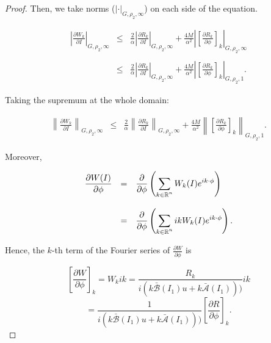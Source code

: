 \begin{proof}
Then, we take norms ($|\cdot|_{G,\rho_2,\infty}$) on each side of the equation.

$$
\begin{array}{rcl}
\displaystyle \left|\frac{\partial W_k}{\partial I}\right|_{G,\rho_2, \infty} & \leq & \displaystyle \frac{2}{\alpha}\left|\frac{\partial R_k}{\partial I}\right|_{G,\rho_2, \infty} +
\displaystyle \frac{4M}{\alpha^2}\left|\left[\frac{\partial R_k}{\partial \phi}\right]_k\right|_{G,\rho_2, \infty}\\
\\
& \leq & \displaystyle \frac{2}{\alpha}\left|\frac{\partial R_k}{\partial I}\right|_{G,\rho_2, \infty} +
\displaystyle \frac{4M}{\alpha^2}\left|\left[\frac{\partial R_k}{\partial \phi}\right]_k\right|_{G,\rho_2, 1}.
\end{array}
$$

Taking the supremum at the whole domain:

$$
\begin{array}{rcl}
\displaystyle \left\|\frac{\partial W_k}{\partial I}\right\|_{G,\rho_2, \infty} & \leq & \displaystyle \frac{2}{\alpha}\left\|\frac{\partial R_k}{\partial I}\right\|_{G,\rho_2, \infty} +
\displaystyle \frac{4M}{\alpha^2}\left\|\left[\frac{\partial R_k}{\partial \phi}\right]_k\right\|_{G,\rho_2, 1}.
\end{array}
$$

Moreover,

$$
\begin{array}{rcl}
\displaystyle \frac{\partial W(I)}{\partial \phi} & = & \displaystyle \frac{\partial}{\partial \phi}\left(\sum_{\begin{subarray}{c} k\in\mathbb{R}^n \end{subarray}} W_k(I)e^{ik\cdot\phi}\right)\\
\\
 & = & \displaystyle \frac{\partial}{\partial \phi}\left(\sum_{\begin{subarray}{c} k\in\mathbb{R}^n \end{subarray}} ik W_k(I)e^{ik\cdot\phi}\right).\\
\end{array}
$$

Hence, the $k$-th term of the Fourier series of $\frac{\partial W}{\partial \phi}$ is

$$\left[\frac{\partial W}{\partial \phi}\right]_k = W_k ik = \frac{R_k}{i(k \bar{\mathcal{B}}(I_1) u  + k \bar{\mathcal{A}}(I_1)))}ik $$
$$= \frac{1}{i(k \bar{\mathcal{B}}(I_1) u  + k \bar{\mathcal{A}}(I_1)))}\left[\frac{\partial R}{\partial \phi}\right]_k.$$


\end{proof}
